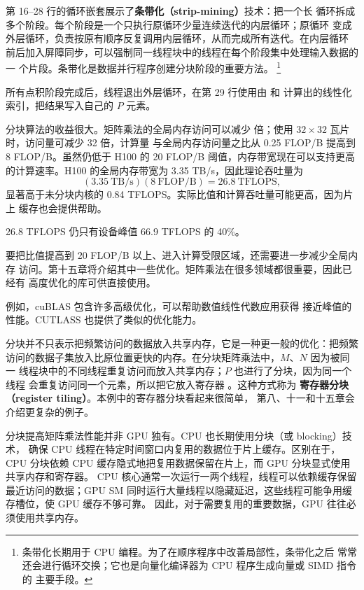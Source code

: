 第 16–28 行的循环嵌套展示了\textbf{条带化（strip-mining）}技术：把一个长
循环拆成多个阶段。每个阶段是一个只执行原循环少量连续迭代的内层循环；原循环
变成外层循环，负责按原有顺序反复调用内层循环，从而完成所有迭代。在内层循环
前后加入屏障同步，可以强制同一线程块中的线程在每个阶段集中处理输入数据的一
个片段。条带化是数据并行程序创建分块阶段的重要方法。
\footnote{条带化长期用于 CPU 编程。为了在顺序程序中改善局部性，条带化之后
常常还会进行循环交换；它也是向量化编译器为 CPU 程序生成向量或 SIMD 指令的
主要手段。}

所有点积阶段完成后，线程退出外层循环，在第 29 行使用由  和
 计算出的线性化索引，把结果写入自己的 $P$ 元素。

分块算法的收益很大。矩阵乘法的全局内存访问可以减少
 倍；使用 $32\times32$ 瓦片时，访问量可减少 32 倍，计算量
与全局内存访问量之比从 0.25 FLOP/B 提高到 8 FLOP/B。虽然仍低于 H100 的
20 FLOP/B 阈值，内存带宽现在可以支持更高的计算速率。H100 的全局内存带宽为
3.35 TB/s，因此理论吞吐量为
\[
  (3.35\ \mathrm{TB/s})(8\ \mathrm{FLOP/B})
  =26.8\ \mathrm{TFLOPS},
\]
显著高于未分块内核的 0.84 TFLOPS。实际比值和计算吞吐量可能更高，因为片上
缓存也会提供帮助。

26.8 TFLOPS 仍只有设备峰值 66.9 TFLOPS 的 40\%。

要把比值提高到 20 FLOP/B 以上、进入计算受限区域，还需要进一步减少全局内存
访问。第十五章将介绍其中一些优化。矩阵乘法在很多领域都很重要，因此已经有
高度优化的库可供直接使用。

例如，cuBLAS \cite{cublas-5} 包含许多高级优化，可以帮助数值线性代数应用获得
接近峰值的性能。CUTLASS \cite{cutlass-5} 也提供了类似的优化能力。

分块并不只表示把频繁访问的数据放入共享内存，它是一种更一般的优化：把频繁
访问的数据子集放入比原位置更快的内存。在分块矩阵乘法中，$M$、$N$ 因为被同一
线程块中的不同线程重复访问而放入共享内存；$P$ 也进行了分块，因为同一个线程
会重复访问同一个元素，所以把它放入寄存器 。这种方式称为
\textbf{寄存器分块（register tiling）}。本例中的寄存器分块看起来很简单，
第八、十一和十五章会介绍更复杂的例子。

分块提高矩阵乘法性能并非 GPU 独有。CPU 也长期使用分块（或 blocking）技术，
确保 CPU 线程在特定时间窗口内复用的数据位于片上缓存。区别在于，CPU 分块依赖
CPU 缓存隐式地把复用数据保留在片上，而 GPU 分块显式使用共享内存和寄存器。
CPU 核心通常一次运行一两个线程，线程可以依赖缓存保留最近访问的数据；GPU SM
同时运行大量线程以隐藏延迟，这些线程可能争用缓存槽位，使 GPU 缓存不够可靠。
因此，对于需要复用的重要数据，GPU 往往必须使用共享内存。

